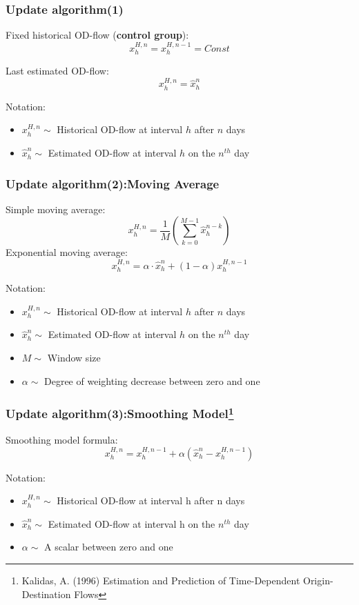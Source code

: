\documentclass[12pt]{beamer}
\begin{document}
\begin{frame}
\frametitle{Update algorithm(1)}
Fixed historical OD-flow (\textbf{control group}):\\

\[ x_h^{H,n}=x_h^{H,n-1}=Const \]

Last estimated OD-flow:\\
\[ x_h^{H,n}=\hat{x}_h^n\]

Notation:
\begin{itemize}
\item $x_h^{H,n} \sim$ Historical OD-flow at interval $h$ after $n$ days
\item $\hat{x}_h^{n} \sim$ Estimated OD-flow at interval $h$ on the $n^{th}$ day
\end{itemize}
\end{frame}

\begin{frame}
\frametitle{Update algorithm(2):Moving Average}

Simple moving average:\\
\[ x_h^{H,n}=\frac{1}{M}(\sum_{k=0}^{M-1} \hat{x}_h^{n-k})\]
Exponential moving average:\\
\[ x_h^{H,n}=\alpha\cdot \hat{x}_h^n+ (1-\alpha) x_h^{H,n-1}\]


Notation:
\begin{itemize}
\item $x_h^{H,n} \sim$ Historical OD-flow at interval $h$ after $n$ days
\item $\hat{x}_h^{n} \sim$ Estimated OD-flow at interval $h$ on the $n^{th}$ day
\item $M\sim$ Window size
\item $\alpha\sim$ Degree of weighting decrease between zero and one
\end{itemize}
\end{frame}

\begin{frame}
\frametitle{Update algorithm(3):Smoothing Model\footnote{Kalidas, A. (1996) Estimation and Prediction of Time-Dependent Origin-Destination Flows}}
Smoothing model formula:\\
\[ x_h^{H,n}=x_h^{H,n-1}+\alpha(\hat{x}_h^n-x_h^{H,n-1}) \]

Notation:\\
\begin{itemize}
\item $x_h^{H,n} \sim$ Historical OD-flow at interval h after n days
\item $\hat{x}_h^{n} \sim$ Estimated OD-flow at interval h on the $n^{th}$ day 
\item $\alpha \sim$ A scalar between zero and one
\end{itemize}



\end{frame}
\end{document}
